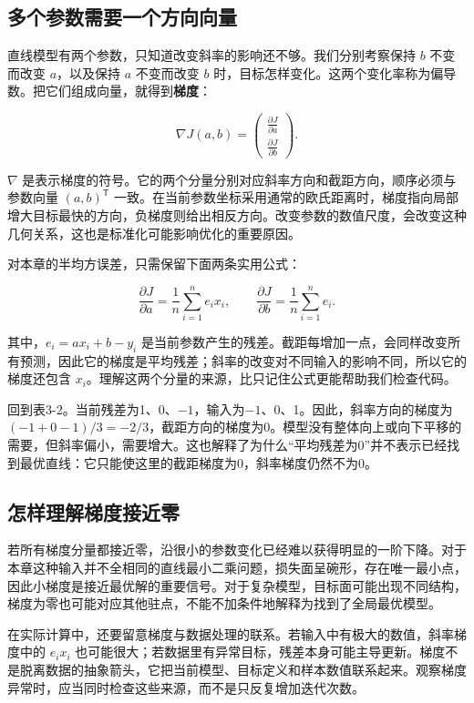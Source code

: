 \subsection{多个参数需要一个方向向量}

直线模型有两个参数，只知道改变斜率的影响还不够。我们分别考察保持 \(b\) 不变而改变 \(a\)，以及保持 \(a\) 不变而改变 \(b\) 时，目标怎样变化。这两个变化率称为偏导数。把它们组成向量，就得到\textbf{梯度}：

\[\nabla J(a,b) = \begin{pmatrix}
\frac{\partial J}{\partial a} \\
\frac{\partial J}{\partial b}
\end{pmatrix}.\]

\(\nabla\) 是表示梯度的符号。它的两个分量分别对应斜率方向和截距方向，顺序必须与参数向量 \((a,b)^{\mathsf{T}}\) 一致。在当前参数坐标采用通常的欧氏距离时，梯度指向局部增大目标最快的方向，负梯度则给出相反方向。改变参数的数值尺度，会改变这种几何关系，这也是标准化可能影响优化的重要原因。

对本章的半均方误差，只需保留下面两条实用公式：

\[\frac{\partial J}{\partial a} = \frac{1}{n}\sum_{i = 1}^{n}e_{i}x_{i},\quad\quad\frac{\partial J}{\partial b} = \frac{1}{n}\sum_{i = 1}^{n}e_{i}.\]

其中，\(e_{i} = ax_{i} + b - y_{i}\) 是当前参数产生的残差。截距每增加一点，会同样改变所有预测，因此它的梯度是平均残差；斜率的改变对不同输入的影响不同，所以它的梯度还包含 \(x_{i}\)。理解这两个分量的来源，比只记住公式更能帮助我们检查代码。

回到表3-2。当前残差为1、0、\(- 1\)，输入为\(- 1\)、0、1。因此，斜率方向的梯度为\(( - 1 + 0 - 1)/3 = - 2/3\)，截距方向的梯度为0。模型没有整体向上或向下平移的需要，但斜率偏小，需要增大。这也解释了为什么``平均残差为0''并不表示已经找到最优直线：它只能使这里的截距梯度为0，斜率梯度仍然不为0。

\subsection{怎样理解梯度接近零}

若所有梯度分量都接近零，沿很小的参数变化已经难以获得明显的一阶下降。对于本章这种输入并不全相同的直线最小二乘问题，损失面呈碗形，存在唯一最小点，因此小梯度是接近最优解的重要信号。对于复杂模型，目标面可能出现不同结构，梯度为零也可能对应其他驻点，不能不加条件地解释为找到了全局最优模型。

在实际计算中，还要留意梯度与数据处理的联系。若输入中有极大的数值，斜率梯度中的 \(e_{i}x_{i}\) 也可能很大；若数据里有异常目标，残差本身可能主导更新。梯度不是脱离数据的抽象箭头，它把当前模型、目标定义和样本数值联系起来。观察梯度异常时，应当同时检查这些来源，而不是只反复增加迭代次数。

